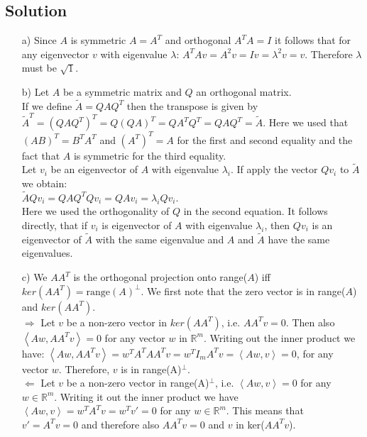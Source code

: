 \documentclass[10pt]{article}
\numberwithin{equation}{section}
\begin{document}
\subsection*{Solution}
\begin{enumerate}
\item[a)]{
    Since $A$ is symmetric $A = A^T$ and orthogonal $A^T A = I$ it follows that for any eigenvector $v$ with eigenvalue $\lambda$: $A^T Av = A^2v = Iv = \lambda^2v = v$. Therefore $\lambda$ must be $\sqrt{1}$.
  }
\item[b)]{
Let $A$ be a symmetric matrix and $Q$ an orthogonal matrix. \\ If we define $\tilde{A} = QAQ^T$ then the transpose is given by $\tilde{A}^T = (QAQ^T)^T = Q(Q A)^T = Q A^TQ^T= Q A Q^T = \tilde{A}$. Here we used that $(AB)^T = B^T A^T$ and $(A^T)^T=A$ for the first and second equality and the fact that $A$ is symmetric for the third equality. \\
Let $v_i$ be an eigenvector of $A$ with eigenvalue $\lambda_i$. If apply the vector $Q v_i$ to $\tilde{A}$ we obtain:\\
 $\tilde{A}Q v_i  = Q A Q^T Q v_i = Q A v_i = \lambda_i Q v_i$. \\
 Here we used the orthogonality of $Q$ in the second equation. It follows directly, that if $v_i$ is eigenvector of $A$ with eigenvalue $\lambda_i$, then $Q v_i$ is an eigenvector of $\tilde{A}$ with the same eigenvalue and $A$ and $\tilde{A}$ have the same eigenvalues. \\
  }
\item[c)]{
 We  $AA^T$ is the orthogonal projection onto range($A$) iff $ker(AA^T) = \text{range}(A)^\perp$. We first note that the zero vector is in range($A$) and $ker(AA^T)$.\\
  $\Rightarrow$ Let $v$ be a non-zero vector in $ker(AA^T)$, i.e. $AA^Tv= 0$. Then also $\left < Aw, AA^Tv\right > = 0$ for any vector $w$ in $ \mathbb{R}^{m}$. Writing out the inner product we have: $\left < Aw, AA^Tv\right > = w^T A ^T A A^Tv = w^T I_m A ^T v = \left<Aw, v\right >=0$, for any vector $w$. Therefore, $v$ is in range(A)$^\perp$. \\
  $\Leftarrow$ Let $v$ be a non-zero vector in range(A)$^\perp$, i.e. $\left< Aw, v\right> = 0$ for any $w \in \mathbb{R}^m$. Writing it out the inner product we have $\left< Aw, v\right> = w^T A^T v = w^T v' = 0$ for any $w \in \mathbb{R}^m$. This means that $v'=A^Tv = 0$ and therefore also $AA^Tv =0$ and $v$ in ker($AA^Tv$).
  }
\end{enumerate}
\end{document}
